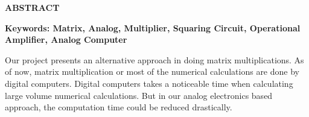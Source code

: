 \begin{center}
	\textbf{ABSTRACT}
\end{center}


\textbf{Keywords: Matrix, Analog, Multiplier, Squaring Circuit, Operational Amplifier, Analog Computer}

Our project presents an alternative approach in doing matrix multiplications. As of now, matrix multiplication or most of the numerical calculations are done by digital computers. Digital computers takes a noticeable time when calculating large volume numerical calculations. But in our analog electronics based approach, the computation time could be reduced drastically.
